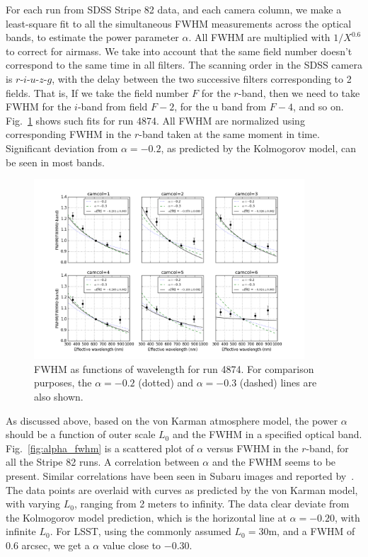 For each run from SDSS Stripe 82 data, and each camera column, we make
a least-square fit to
all the simultaneous FWHM measurements across the optical bands, to
estimate the power parameter $\alpha$.
All FWHM are multiplied with $1/X^{0.6}$ to correct for airmass.
We take into account that the same field number doesn't correspond to the same
time in all filters. The scanning order in the SDSS camera is $r$-$i$-$u$-$z$-$g$, with the delay between the two 
successive filters corresponding to 2 fields. That is, If we take the field number $F$ for the $r$-band, then
we need to take FWHM for the $i$-band from field $F-2$, for the u band
from $F-4$, and so on. Fig.~\ref{fig:fwhm_lambda} shows such fits for
run 4874. All FWHM are normalized using corresponding FWHM in the
$r$-band taken at the same moment in time.
Significant deviation from $\alpha = -0.2$, as predicted by the
Kolmogorov model, can be seen in most bands.

\begin{figure}
\centering
\includegraphics[width=0.9\textwidth]{FIGURES/fwhm_lambda.png}
\caption{FWHM as functions of wavelength for run 4874.
For comparison purposes, the $\alpha=-0.2$ (dotted) and $\alpha=-0.3$ (dashed) lines are
also shown.
\label{fig:fwhm_lambda}}
\end{figure}

As discussed above, based on the von Karman atmosphere model, the
power $\alpha$ should be a function of outer scale $L_0$ and the
FWHM in a specified optical band.
Fig.~\ref{fig:alpha_fwhm} is a scattered plot of $\alpha$ versus FWHM
in the $r$-band, for all the Stripe 82 runs.
A correlation between $\alpha$ and the FWHM seems to be present.
Similar correlations have been seen in Subaru images and reported by~\cite{subaruSeeing2016}.
The data points are overlaid with curves as predicted by the von
Karman model, with varying $L_0$, ranging from 2 meters to infinity.
The data clear deviate from the Kolmogorov model prediction, which is
the horizontal line at $\alpha = -0.20$, with infinite $L_0$.
For LSST, using the commonly assumed $L_0 = 30$m, and a FWHM of 0.6
arcsec, we get a $\alpha$ value close to $-0.30$.

